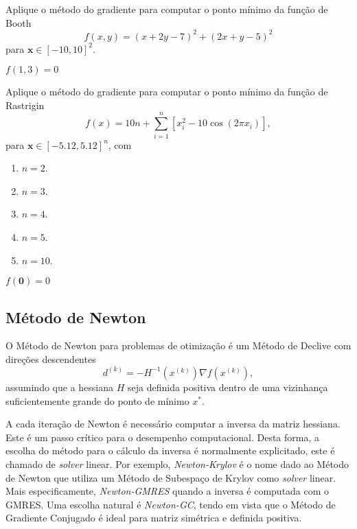 \begin{exer}
  Aplique o método do gradiente para computar o ponto mínimo da função de Booth
  \begin{equation}
    f(x,y) = \left( x + 2y -7\right)^{2} + \left(2x +y - 5\right)^{2}
  \end{equation}
  para $\pmb{x}\in [-10, 10]^2$.
\end{exer}
\begin{resp}
  $f(1,3)=0$
\end{resp}

\begin{exer}
  Aplique o método do gradiente para computar o ponto mínimo da função de Rastrigin
  \begin{equation}
    f(x) = 10 n + \sum_{i=1}^n \left[x_i^2 - 10\cos(2 \pi x_i)\right],
  \end{equation}
  para $\pmb{x}\in[-5.12, 5.12]^n$, com
  \begin{enumerate}
    \item $n = 2$.
    \item $n = 3$.
    \item $n = 4$.
    \item $n = 5$.
    \item $n = 10$.
  \end{enumerate}
\end{exer}
\begin{resp}
$f(\pmb{0}) = 0$
\end{resp}


\subsection{Método de Newton}
\badgeRevisar

O Método de Newton{\newton} para problemas de otimização é um Método de Declive com direções descendentes
\begin{equation}
  d^{(k)} = -H^{-1}(x^{(k)})\nabla f(x^{(k)}),
\end{equation}
assumindo que a hessiana $H$ seja definida positiva dentro de uma vizinhança suficientemente grande do ponto de mínimo $x^*$.

\begin{obs}
  A cada iteração de Newton é necessário computar a inversa da matriz hessiana. Este é um passo crítico para o desempenho computacional. Desta forma, a escolha do método para o cálculo da inversa é normalmente explicitado, este é chamado de {\it solver} linear. Por exemplo, \emph{Newton-Krylov} é o nome dado ao Método de Newton que utiliza um Método de Subespaço de Krylov como {\it solver} linear. Mais especificamente, \emph{Newton-GMRES} quando a inversa é computada com o GMRES. Uma escolha natural é \emph{Newton-GC}, tendo em vista que o Método de Gradiente Conjugado é ideal para matriz simétrica e definida positiva.
\end{obs}

